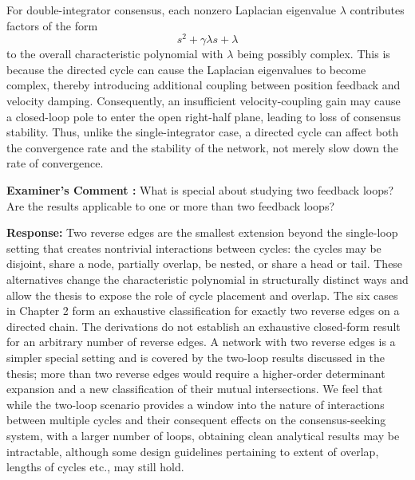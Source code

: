 \documentclass[11pt,a4paper]{article}
\newcounter{examcomment}
\renewcommand{\theexamcomment}{\arabic{examcomment}}
\newcommand{\comment}[1]{%
\refstepcounter{examcomment}%
\par\vspace{5pt}\noindent
\colorbox{gray!13}{%
	\parbox{\dimexpr\linewidth-2\fboxsep}{%
		\textbf{Examiner's Comment \theexamcomment:} #1%
	}%
}%
\par
}
\newcounter{problem}
\newcommand{\response}{\par\textbf{Response:} }
\newcommand{\revision}{\par\textbf{Proposed thesis revision:} }
\begin{document}
For double-integrator consensus, each nonzero Laplacian eigenvalue $\lambda$ contributes factors of the form
\[
s^2+\gamma\lambda s+\lambda
\]
to the overall characteristic polynomial with $\lambda$ being possibly complex. This is because the directed cycle can cause the Laplacian eigenvalues to become complex, thereby introducing additional coupling between position feedback and velocity damping. Consequently, an insufficient velocity-coupling gain may cause a closed-loop pole to enter the open right-half plane, leading to loss of consensus stability. Thus, unlike the single-integrator case, a directed cycle can affect both the convergence rate and the stability of the network, not merely slow down the rate of convergence.
	
	
\comment{What is special about studying two feedback loops? Are the results applicable to one or more than two feedback loops?}
\response
Two reverse edges are the smallest extension beyond the single-loop setting that creates nontrivial interactions between cycles: the cycles may be disjoint, share a node, partially overlap, be nested, or share a head or tail. These alternatives change the characteristic polynomial in structurally distinct ways and allow the thesis to expose the role of cycle placement and overlap. The six cases in Chapter 2 form an exhaustive classification for exactly two reverse edges on a directed chain. The derivations do not establish an exhaustive closed-form result for an arbitrary number of reverse edges. A network with two reverse edges is a simpler special setting and is covered by the two-loop results discussed in the thesis; more than two reverse edges would require a higher-order determinant expansion and a new classification of their mutual intersections. We feel that while the two-loop scenario provides a window into the nature of interactions between multiple cycles and their consequent effects on the consensus-seeking system, with a larger number of loops, obtaining clean analytical results may be intractable, although some design guidelines pertaining to extent of overlap, lengths of cycles etc., may still hold.

\end{document}
